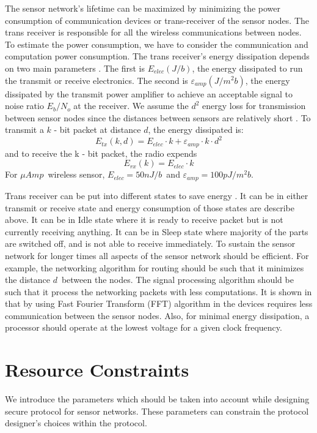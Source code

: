 	The sensor network's lifetime can be maximized by minimizing the power consumption of communication devices or trans-receiver of the sensor nodes.
	The trans receiver is responsible for all the wireless communications between nodes.
	To estimate the power consumption, we have to consider the communication and computation power consumption.
	The trans receiver's energy dissipation depends on two main parameters \cite{wang2002energy}.
	The first is $E_{elec} (J/b)$, the energy dissipated to run the transmit or receive electronics.
	The second is $\varepsilon_{amp} (J/m^2 b)$, the energy dissipated by the transmit power amplifier to achieve an acceptable signal to noise ratio $E_{b} / N_{o} $ at the receiver.
	We assume the $d^2$ energy loss for transmission between sensor nodes since the distances between sensors are relatively short \cite{ettus1998system}. 
	To transmit a $k$ - bit packet at distance $d$, the energy dissipated is:
	\begin{equation}
		E_{tx}(k, d) = E_{elec} \cdot k + \varepsilon_{amp} \cdot k \cdot d^{2}
	\end{equation}
	and to receive the k - bit packet, the radio expends
	\begin{equation}
		E_{rx}(k) = E_{elec} \cdot k
	\end{equation}
	For $\mu Amp$\ wireless sensor, $E_{elec} = 50nJ/b$\ and $\varepsilon_{amp} = 100pJ/m^2 b$.

	Trans receiver can be put into different states to save energy \cite{karl2007protocols}.
	It can be in either transmit or receive state and energy consumption of those states are describe above.
	It can be in Idle state where it is ready to receive packet but is not currently receiving anything.
	It can be in Sleep state where majority of the parts are switched off, and is not able to receive immediately. 
 	To sustain the sensor network for longer times all aspects of the sensor network should be efficient.
	For example, the networking algorithm for routing should be such that it minimizes the distance $d$\ between the nodes.
	The signal processing algorithm should be such that it process the networking packets with less computations.
	It is shown in \cite{wang2002energy} that by using Fast Fourier Transform (FFT) algorithm in the devices requires less communication between the sensor nodes.
	Also, for minimal energy dissipation, a processor should operate at the lowest voltage for a given clock frequency.

\section{Resource Constraints}
	\label{sec:aggregate-adversary}
	We introduce the parameters which should be taken into account while designing secure protocol for sensor networks.  
	These parameters can constrain the protocol designer's choices within the protocol.

